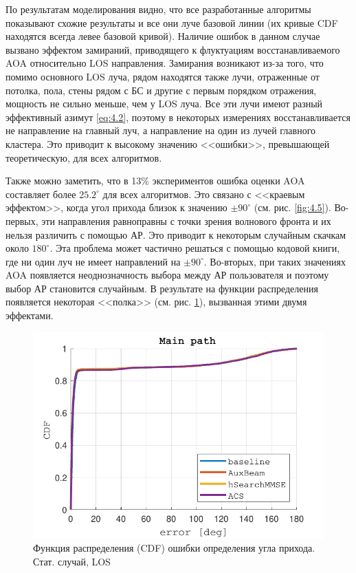 По результатам моделирования видно, что все разработанные алгоритмы показывают 
схожие результаты и все они луче базовой линии (их кривые CDF находятся всегда
левее базовой кривой). Наличие ошибок в данном случае вызвано эффектом
замираний, приводящего к флуктуациям восстанавливаемого AOA относительно LOS
направления.  Замирания возникают из-за того, что помимо основного LOS луча,
рядом находятся также лучи, отраженные от потолка, пола, стены рядом с БС и
другие с первым порядком отражения, мощность не сильно меньше, чем у LOS луча.
Все эти лучи имеют разный эффективный азимут \eqref{eq:4.2}, поэтому в некоторых
измерениях восстанавливается не направление на главный луч, а направление на
один из лучей главного кластера. Это приводит к высокому значению <<ошибки>>,
превышающей теоретическую, для всех алгоритмов.

Также можно заметить, что в 13\% экспериментов ошибка оценки AOA составляет
более $25.2^\circ$ для всех алгоритмов. Это связано с <<краевым эффектом>>,
когда угол прихода близок к значению $\pm 90^\circ$ (см. рис. \ref{fig:4.5}).
Во-первых, эти направления равноправны с точки зрения волнового фронта и их
нельзя различить с помощью АР.  Это приводит к некоторым случайным скачкам около
$180^\circ$. Эта проблема может частично решаться с помощью кодовой книги, где
ни один луч не имеет направлений на $\pm 90^\circ$.  Во-вторых, при таких
значениях AOA появляется неоднозначность выбора между АР пользователя и поэтому
выбор АР становится случайным. В результате на функции распределения появляется 
некоторая <<полка>> (см. рис. \ref{fig:singlepath:static:LOSa}), вызванная этими
двумя эффектами.
\begin{figure}[ht]
  \centering
  \includegraphics{results/rus/singlepath-static-LOS-full-1}
  \caption{Функция распределения (CDF) ошибки определения угла прихода. Стат. случай, LOS}
  \label{fig:singlepath:static:LOSa}
\end{figure}

